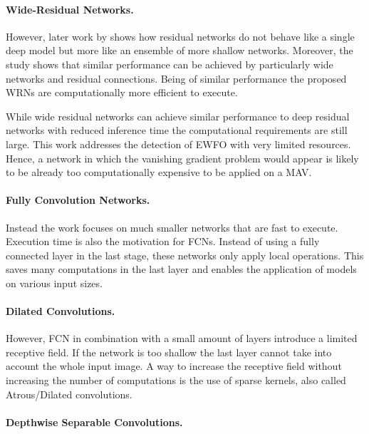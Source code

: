 \paragraph{Wide-Residual Networks.}

However, later work by \citeauthor{Zagoruyko2016} \cite{Zagoruyko2016} shows how residual networks do not behave like a single deep model but more like an ensemble of more shallow networks. Moreover, the study shows that similar performance can be achieved by particularly wide networks and residual connections. Being of similar performance the proposed \acp{WRN} are computationally more efficient to execute.

While wide residual networks can achieve similar performance to deep residual networks with reduced inference time the computational requirements are still large. This work addresses the detection of \ac{EWFO} with very limited resources. Hence, a network in which the vanishing gradient problem would appear is likely to be already too computationally expensive to be applied on a \ac{MAV}.

\paragraph{Fully Convolution Networks.}

Instead the work focuses on much smaller networks that are fast to execute. Execution time is also the motivation for \acp{FCN}. Instead of using a fully connected layer in the last stage, these networks only apply local operations. This saves many computations in the last layer and enables the application of models on various input sizes.

\paragraph{Dilated Convolutions.}

However, \ac{FCN} in combination with a small amount of layers introduce a limited receptive field. If the network is too shallow the last layer cannot take into account the whole input image. A way to increase the receptive field without increasing the number of computations is the use of sparse kernels, also called Atrous/Dilated convolutions. 

\paragraph{Depthwise Separable Convolutions.}

